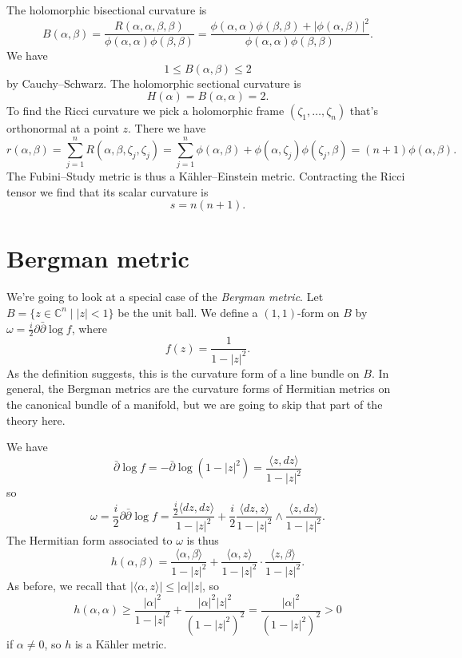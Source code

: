 \documentclass[10pt,a4paper]{article}
\newcommand{\kk}[1]{\mathbb{#1}}
\begin{document}
The holomorphic bisectional curvature is
$$
B(\alpha,\beta) = \frac{R(\alpha,\alpha,\beta,\beta)}{\phi(\alpha,\alpha)\phi(\beta,\beta)}
= \frac{\phi(\alpha,\alpha)\phi(\beta,\beta)+|\phi(\alpha,\beta)|^2}{\phi(\alpha,\alpha)\phi(\beta,\beta)}.
$$
We have
$$
1 \leq B(\alpha,\beta) \leq 2
$$
by Cauchy--Schwarz. The holomorphic sectional curvature is
$$
H(\alpha) = B(\alpha,\alpha) = 2.
$$
To find the Ricci curvature we pick a holomorphic frame $(\zeta_1, \ldots, \zeta_n)$ that's orthonormal at a point $z$. There we have
$$
r(\alpha,\beta)
= \sum_{j=1}^n R(\alpha,\beta,\zeta_j,\zeta_j)
= \sum_{j=1}^n \phi(\alpha,\beta) + \phi(\alpha,\zeta_j)\phi(\zeta_j,\beta)
= (n+1) \phi(\alpha,\beta).
$$
The Fubini--Study metric is thus a K\"ahler--Einstein metric. Contracting the Ricci tensor we find that its scalar curvature is
$$
s = n(n+1).
$$




\section{Bergman metric}
\label{sec:org21fa1aa}

We're going to look at a special case of the \emph{Bergman metric}. Let $B = \{ z \in \kk C^n \mid |z|<1 \}$ be the unit ball. We define a $(1,1)$-form on $B$ by $\omega = \frac i2 \partial \bar \partial \log f$, where
$$
f(z) = \frac{1}{1-|z|^2}.
$$
As the definition suggests, this is the curvature form of a line bundle on $B$. In general, the Bergman metrics are the curvature forms of Hermitian metrics on the canonical bundle of a manifold, but we are going to skip that part of the theory here.

We have
$$
\bar\partial \log f
= - \bar\partial \log (1 -|z|^2)
= \frac{\langle z, dz\rangle}{1 - |z|^2}
$$
so
$$
\omega
= \frac i2 \partial\bar\partial \log f
= \frac{\frac i2 \langle dz, dz\rangle}{1-|z|^2}
+ \frac i2 \frac{\langle dz, z \rangle}{1-|z|^2}\wedge \frac{\langle z, dz \rangle}{1-|z|^2}.
$$
The Hermitian form associated to $\omega$ is thus
$$
h(\alpha,\beta)
=\frac{\langle \alpha, \beta\rangle}{1-|z|^2}
+ \frac{\langle \alpha, z \rangle}{1-|z|^2}
\cdot \frac{\langle z, \beta \rangle}{1-|z|^2}.
$$
As before, we recall that $|\langle \alpha, z \rangle| \leq |\alpha| |z|$, so
$$
h(\alpha,\alpha)
\geq \frac{|\alpha|^2}{1-|z|^2}
+ \frac{|\alpha|^2|z|^2}{(1-|z|^2)^2}
= \frac{|\alpha|^2}{(1-|z|^2)^2}
> 0
$$
if $\alpha \not= 0$, so $h$ is a K\"ahler metric.
\end{document}
